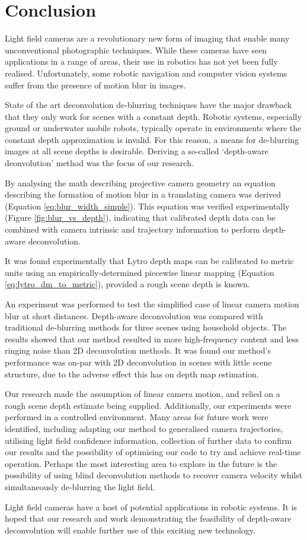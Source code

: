 
\chapter{Conclusion}
\label{chap:conclusion}

Light field cameras are a revolutionary new form of imaging that enable many unconventional photographic techniques.
While these cameras have seen applications in a range of areas, their use in robotics has not yet been fully realised.
Unfortunately, some robotic navigation and computer vision systems suffer from the presence of motion blur in images.

State of the art deconvolution de-blurring techniques have the major drawback that they only work for scenes with a constant depth.
Robotic systems, especially ground or underwater mobile robots, typically operate in environments where the constant depth approximation is invalid.
For this reason, a means for de-blurring images at all scene depths is desirable.
Deriving a so-called \enquote*{depth-aware deonvolution} method was the focus of our research.

By analysing the math describing projective camera geometry an equation describing the formation of motion blur in a translating camera was derived (Equation \ref{eq:blur_width_simple}).
This equation was verified experimentally (Figure \ref{fig:blur_vs_depth}), indicating that calibrated depth data can be combined with camera intrinsic and trajectory information to perform depth-aware deconvolution.

It was found experimentally that Lytro depth maps can be calibrated to metric units using an empirically-determined piecewise linear mapping (Equation  \ref{eq:lytro_dm_to_metric}), provided a rough scene depth is known.

An experiment was performed to test the simplified case of linear camera motion blur at short distances.
Depth-aware deconvolution was compared with traditional de-blurring methods for three scenes using household objects.
The results showed that our method resulted in more high-frequency content and less ringing noise than 2D deconvolution methods.
It was found our method's performance was on-par with 2D deconvolution in scenes with little scene structure, due to the adverse effect this has on depth map estimation.

Our research made the assumption of linear camera motion, and relied on a rough scene depth estimate being supplied.
Additionally, our experiments were performed in a controlled environment.
Many areas for future work were identified, including adapting our method to generalised camera trajectories, utilising light field confidence information, collection of further data to confirm our results and the possibility of optimising our code to try and achieve real-time operation.
Perhaps the most interesting area to explore in the future is the possibility of using blind deconvolution methods to recover camera velocity whilst simultaneously de-blurring the light field.

Light field cameras have a host of potential applications in robotic systems.
It is hoped that our research and work demonstrating the feasibility of depth-aware deconvolution will enable further use of this exciting new technology.
